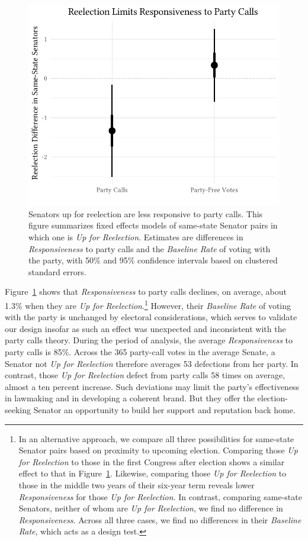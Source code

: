 \documentclass[12pt]{article}
\begin{document}
\begin{figure}[!htbp]
\centering
\includegraphics[width = 12cm]{senate_difference_estimates.pdf}

\caption{Senators up for reelection are less responsive to party calls.
This figure summarizes fixed effects models of same-state Senator pairs in which one is \textit{Up for Reelection}. Estimates are differences in \textit{Responsiveness} to party calls and the \textit{Baseline Rate} of voting with the party, with 50\% and 95\% confidence intervals based on clustered standard errors.
\label{fig-reelection-responsiveness}}
\end{figure}

Figure~\ref{fig-reelection-responsiveness} shows that \textit{Responsiveness} to party calls declines, on average, about 1.3\% when they are \textit{Up for Reelection}.\footnote{\doublespacing\normalsize  In an alternative approach, we compare all three possibilities for same-state Senator pairs based on proximity to upcoming election.  Comparing those \textit{Up for Reelection} to those in the first Congress after election shows a similar effect to that in Figure~\ref{fig-reelection-responsiveness}.  Likewise, comparing those \textit{Up for Reelection} to those in the middle two years of their six-year term reveals lower \textit{Responsiveness} for those \textit{Up for Reelection}.  In contrast, comparing same-state Senators, neither of whom are \textit{Up for Reelection}, we find no difference in \textit{Responsiveness}.  Across all three cases, we find no differences in their \textit{Baseline Rate}, which acts as a design test.}  However, their \textit{Baseline Rate} of voting with the party is unchanged by electoral considerations, which serves to validate our design insofar as such an effect was unexpected and inconsistent with the party calls theory.  During the period of analysis, the average \textit{Responsiveness} to party calls is 85\%. Across the 365 party-call votes in the average Senate, a Senator not \textit{Up for Reelection} therefore averages 53 defections from her party.  In contrast, those \textit{Up for Reelection} defect from party calls 58 times on average, almost a ten percent increase.  Such deviations may limit the party's effectiveness in lawmaking and in developing a coherent brand.  But they offer the election-seeking Senator an opportunity to build her support and reputation back home.
\end{document}
